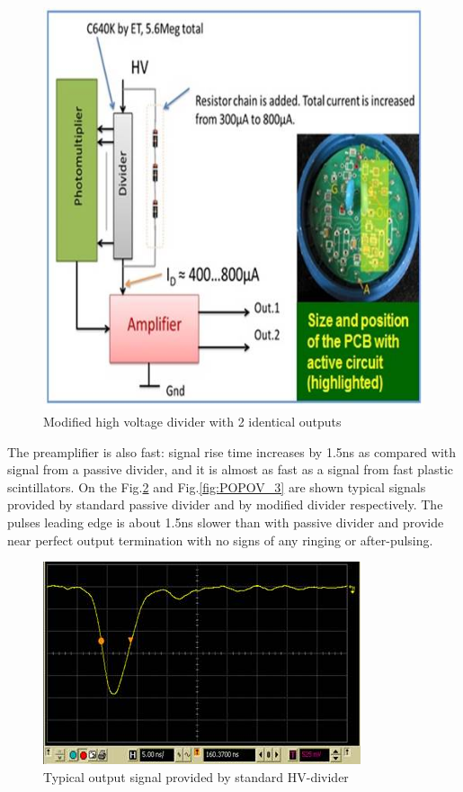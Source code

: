 \begin{figure}[!h]
    \centering
    \includegraphics[width=1.0\linewidth,trim={0.0cm 0.0cm 0.0cm 0.0cm},clip]{images/POPOV_1.jpg}
    \caption{Modified high voltage divider with 2 identical outputs}
    \label{fig:POPOV_1}
\end{figure}

The preamplifier is also fast: signal rise time increases by 1.5ns as compared with signal from a passive divider, and it is almost as fast as a signal from fast plastic scintillators. On the Fig.\ref{fig:POPOV_2} and Fig.\ref{fig:POPOV_3} are shown typical signals provided by standard passive divider and by modified divider respectively. The pulses leading edge is about 1.5ns slower than with passive divider and provide near perfect output termination with no signs of any ringing or after-pulsing.

\begin{figure}[!h]
    \centering
    \includegraphics[width=1.0\linewidth,trim={0.0cm 0.0cm 0.0cm 0.0cm},clip]{images/POPOV_2.jpg}
    \caption{Typical output signal provided by standard HV-divider}
    \label{fig:POPOV_2}
\end{figure}

